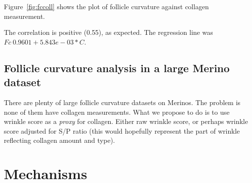 \documentclass{article}
\begin{document}
Figure~\ref{fig:fccoll} shows the plot of follicle curvature against collagen measurement. 

The correlation is positive (0.55), as expected.  The regression line was $Fc ~ 0.9601 + 5.843e-03 * C $.  



\subsection{ Follicle curvature analysis in a large Merino dataset}
 There are plenty of large follicle curvature datasets on Merinos. The problem is none of them have collagen measurements. What we propose to do is to use wrinkle score as a {\em proxy} for collagen. Either raw wrinkle score, or perhaps wrinkle score adjusted for S/P ratio (this would hopefully represent the part of wrinkle reflecting collagen amount and type).

\section{Mechanisms}




\end{document}

